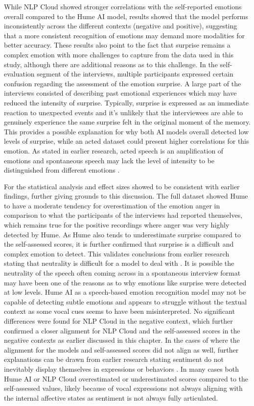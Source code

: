 While NLP Cloud showed stronger correlations with the self-reported emotions overall compared to the Hume AI model, results showed that the model performs inconsistently across the different contexts (negative and positive), suggesting that a more consistent recognition of emotions may demand more modalities for better accuracy. These results also point to the fact that surprise remains a complex emotion with more challenges to capture from the data used in this study, although there are additional reasons as to this challenge. In the self-evaluation segment of the interviews, multiple participants expressed certain confusion regarding the assessment of the emotion surprise. A large part of the interviews consisted of describing past emotional experiences which may have reduced the intensity of surprise. Typically, surprise is expressed as an immediate reaction to unexpected events and it’s unlikely that the interviewees are able to genuinely experience the same surprise felt in the original moment of the memory. This provides a possible explanation for why both AI models overall detected low levels of surprise, while an acted dataset could present higher correlations for this emotion. As stated in earlier research, acted speech is an amplification of emotions and spontaneous speech may lack the level of intensity to be distinguished from different emotions \autocite{Chakraborty2016}.

For the statistical analysis and effect sizes showed to be consistent with earlier findings, further giving grounds to this discussion. 
The full dataset showed Hume to have a moderate tendency for overestimation of the emotion anger in comparison to what the participants of the interviews had reported themselves, which remains true for the positive recordings where anger was very highly detected by Hume. As Hume also tends to underestimate surprise compared to the self-assessed scores, it is further confirmed that surprise is a difficult and complex emotion to detect. This validates conclusions from earlier research stating that neutrality is difficult for a model to deal with \autocite{Cao2015}. It is possible the neutrality of the speech often coming across in a spontaneous interview format may have been one of the reasons as to why emotions like surprise were detected at low levels. Hume AI as a speech-based emotion recognition model may not be capable of detecting subtle emotions and appears to struggle without the textual context as some vocal cues seems to have been misinterpreted.
No significant differences were found for NLP Cloud in the negative context, which further confirmed a closer alignment for NLP Cloud and the self-assessed scores in the negative contexts as earlier discussed in this chapter.
In the cases of where the alignment for the models and self-assessed scores did not align as well, further explanations can be drawn from earlier research stating sentiment do not inevitably display themselves in expressions or behaviors \autocite{Soleymani2017}. In many cases both Hume AI or NLP Cloud overestimated or underestimated scores compared to the self-assessed values, likely because of vocal expressions not always aligning with the internal affective states as sentiment is not always fully articulated.
